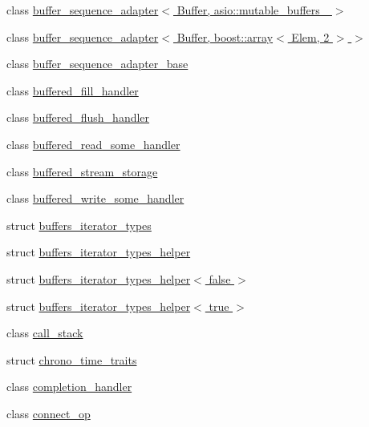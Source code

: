 \begin{DoxyCompactItemize}
\item 
class \hyperlink{classasio_1_1detail_1_1buffer__sequence__adapter_3_01_buffer_00_01asio_1_1mutable__buffers__1_01_4}{buffer\+\_\+sequence\+\_\+adapter$<$ Buffer, asio\+::mutable\+\_\+buffers\+\_ $>$}
\item 
class \hyperlink{classasio_1_1detail_1_1buffer__sequence__adapter_3_01_buffer_00_01boost_1_1array_3_01_elem_00_012_01_4_01_4}{buffer\+\_\+sequence\+\_\+adapter$<$ Buffer, boost\+::array$<$ Elem, 2 $>$ $>$}
\item 
class \hyperlink{classasio_1_1detail_1_1buffer__sequence__adapter__base}{buffer\+\_\+sequence\+\_\+adapter\+\_\+base}
\item 
class \hyperlink{classasio_1_1detail_1_1buffered__fill__handler}{buffered\+\_\+fill\+\_\+handler}
\item 
class \hyperlink{classasio_1_1detail_1_1buffered__flush__handler}{buffered\+\_\+flush\+\_\+handler}
\item 
class \hyperlink{classasio_1_1detail_1_1buffered__read__some__handler}{buffered\+\_\+read\+\_\+some\+\_\+handler}
\item 
class \hyperlink{classasio_1_1detail_1_1buffered__stream__storage}{buffered\+\_\+stream\+\_\+storage}
\item 
class \hyperlink{classasio_1_1detail_1_1buffered__write__some__handler}{buffered\+\_\+write\+\_\+some\+\_\+handler}
\item 
struct \hyperlink{structasio_1_1detail_1_1buffers__iterator__types}{buffers\+\_\+iterator\+\_\+types}
\item 
struct \hyperlink{structasio_1_1detail_1_1buffers__iterator__types__helper}{buffers\+\_\+iterator\+\_\+types\+\_\+helper}
\item 
struct \hyperlink{structasio_1_1detail_1_1buffers__iterator__types__helper_3_01false_01_4}{buffers\+\_\+iterator\+\_\+types\+\_\+helper$<$ false $>$}
\item 
struct \hyperlink{structasio_1_1detail_1_1buffers__iterator__types__helper_3_01true_01_4}{buffers\+\_\+iterator\+\_\+types\+\_\+helper$<$ true $>$}
\item 
class \hyperlink{classasio_1_1detail_1_1call__stack}{call\+\_\+stack}
\item 
struct \hyperlink{structasio_1_1detail_1_1chrono__time__traits}{chrono\+\_\+time\+\_\+traits}
\item 
class \hyperlink{classasio_1_1detail_1_1completion__handler}{completion\+\_\+handler}
\item 
class \hyperlink{classasio_1_1detail_1_1connect__op}{connect\+\_\+op}

\end{DoxyCompactItemize}
